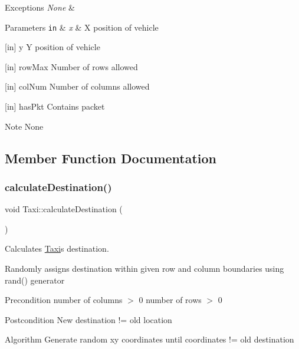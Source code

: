 \begin{DoxyExceptions}{Exceptions}
{\em None} & \\
\hline
\end{DoxyExceptions}

\begin{DoxyParams}[1]{Parameters}
\mbox{\tt in}  & {\em x} & X position of vehicle\\
\hline
\end{DoxyParams}
\mbox{[}in\mbox{]} y Y position of vehicle

\mbox{[}in\mbox{]} row\+Max Number of rows allowed

\mbox{[}in\mbox{]} col\+Num Number of columns allowed

\mbox{[}in\mbox{]} has\+Pkt Contains packet

\begin{DoxyNote}{Note}
None 
\end{DoxyNote}


\subsection{Member Function Documentation}
\hypertarget{class_taxi_aa746995561a978caeaa496b7350056be}{}\label{class_taxi_aa746995561a978caeaa496b7350056be} 
\subsubsection{\texorpdfstring{calculate\+Destination()}{calculateDestination()}}
{\footnotesize\ttfamily void Taxi\+::calculate\+Destination (\begin{DoxyParamCaption}{ }\end{DoxyParamCaption})\hspace{0.3cm}{\ttfamily [virtual]}}



Calculates \hyperlink{class_taxi}{Taxi}\textquotesingle{}s destination. 

Randomly assigns destination within given row and column boundaries using rand() generator

\begin{DoxyPrecond}{Precondition}
number of columns $>$ 0 number of rows $>$ 0
\end{DoxyPrecond}
\begin{DoxyPostcond}{Postcondition}
New destination != old location
\end{DoxyPostcond}
\begin{DoxyParagraph}{Algorithm}
Generate random xy coordinates until coordinates != old destination
\end{DoxyParagraph}

